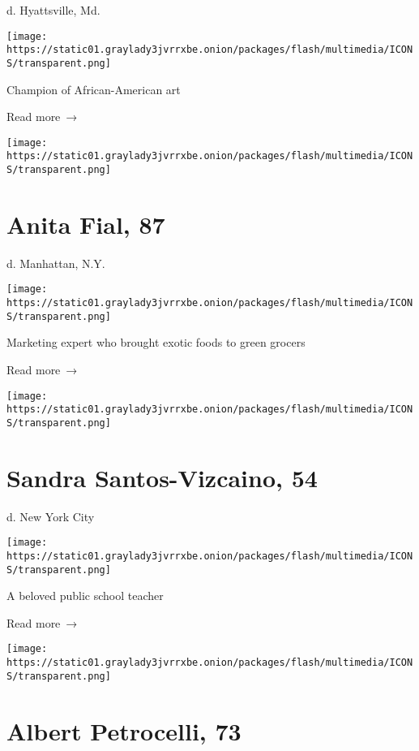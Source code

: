 d. Hyattsville, Md.

\texttt{[image: https://static01.graylady3jvrrxbe.onion/packages/flash/multimedia/ICONS/transparent.png]}

Champion of African-American art

 Read more~→

\href{https://www.nytimes3xbfgragh.onion/2020/04/07/obituaries/anita-fial-dead-coronavirus.html}{}

\texttt{[image: https://static01.graylady3jvrrxbe.onion/packages/flash/multimedia/ICONS/transparent.png]}

\hypertarget{anita-fial-87}{%
\section{Anita Fial, 87}\label{anita-fial-87}}

d. Manhattan, N.Y.

\texttt{[image: https://static01.graylady3jvrrxbe.onion/packages/flash/multimedia/ICONS/transparent.png]}

Marketing expert who brought exotic foods to green grocers

 Read more~→

\href{https://www.nytimes3xbfgragh.onion/2020/04/07/obituaries/sandra-santos-vizcaino-dead-coronavirus.html}{}

\texttt{[image: https://static01.graylady3jvrrxbe.onion/packages/flash/multimedia/ICONS/transparent.png]}

\hypertarget{sandra-santos-vizcaino-54}{%
\section{Sandra Santos-Vizcaino, 54}\label{sandra-santos-vizcaino-54}}

d. New York City

\texttt{[image: https://static01.graylady3jvrrxbe.onion/packages/flash/multimedia/ICONS/transparent.png]}

A beloved public school teacher

 Read more~→

\href{https://www.nytimes3xbfgragh.onion/2020/04/07/obituaries/albert-petrocelli-dead-coronavirus.html}{}

\texttt{[image: https://static01.graylady3jvrrxbe.onion/packages/flash/multimedia/ICONS/transparent.png]}

\hypertarget{albert-petrocelli-73}{%
\section{Albert Petrocelli, 73}\label{albert-petrocelli-73}}

